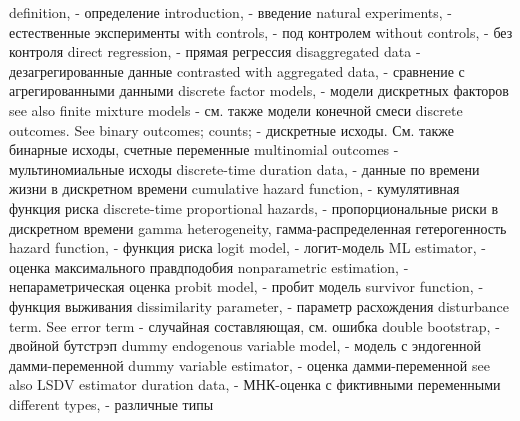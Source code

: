 definition, - определение
introduction, - введение
natural experiments, - естественные эксперименты 
with controls, - под контролем
without controls, - без контроля
direct regression, - прямая регрессия
disaggregated data - дезагрегированные данные
contrasted with aggregated data, - сравнение с агрегированными данными 
discrete factor models, - модели дискретных факторов
see also finite mixture models - см. также модели конечной смеси
discrete outcomes. See binary outcomes; counts; - дискретные исходы. См. также бинарные исходы, счетные переменные
multinomial outcomes - мультиномиальные исходы
discrete-time duration data, - данные по времени жизни в дискретном времени
cumulative hazard function, - кумулятивная функция риска
discrete-time proportional hazards, - пропорциональные риски в дискретном времени
gamma heterogeneity, гамма-распределенная гетерогенность
hazard function, - функция риска
logit model, - логит-модель
ML estimator, - оценка максимального правдподобия
nonparametric estimation, - непараметрическая оценка
probit model, - пробит модель
survivor function, - функция выживания
dissimilarity parameter, - параметр расхождения
disturbance term. See error term - случайная составляющая, см. ошибка
double bootstrap, - двойной бутстрэп
dummy endogenous variable model, - модель с эндогенной дамми-переменной
dummy variable estimator, - оценка дамми-переменной
see also LSDV estimator duration data, - МНК-оценка с фиктивными переменными
different types, - различные типы

